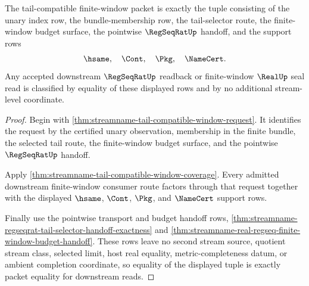 \begin{theorem}
\label{thm:streamname-tail-compatible-window-packet}
The tail-compatible finite-window packet is exactly the tuple consisting of the unary index row, the bundle-membership row, the tail-selector route, the finite-window budget surface, the pointwise $\RegSeqRatUp$ handoff, and the support rows
$$
\hsame,\quad \Cont,\quad \Pkg,\quad \NameCert.
$$
Any accepted downstream $\RegSeqRatUp$ readback or finite-window $\RealUp$ seal read is classified by equality of these displayed rows and by no additional stream-level coordinate.
\end{theorem}
\begin{proof}
Begin with \autoref{thm:streamname-tail-compatible-window-request}. It identifies the request by the certified unary observation, membership in the finite bundle, the selected tail route, the finite-window budget surface, and the pointwise $\RegSeqRatUp$ handoff.

Apply \autoref{thm:streamname-tail-compatible-window-coverage}. Every admitted downstream finite-window consumer route factors through that request together with the displayed $\hsame$, $\Cont$, $\Pkg$, and $\NameCert$ support rows.

Finally use the pointwise transport and budget handoff rows, \autoref{thm:streamname-regseqrat-tail-selector-handoff-exactness} and \autoref{thm:streamname-real-regseq-finite-window-budget-handoff}. These rows leave no second stream source, quotient stream class, selected limit, host real equality, metric-completeness datum, or ambient completion coordinate, so equality of the displayed tuple is exactly packet equality for downstream reads.
\end{proof}

